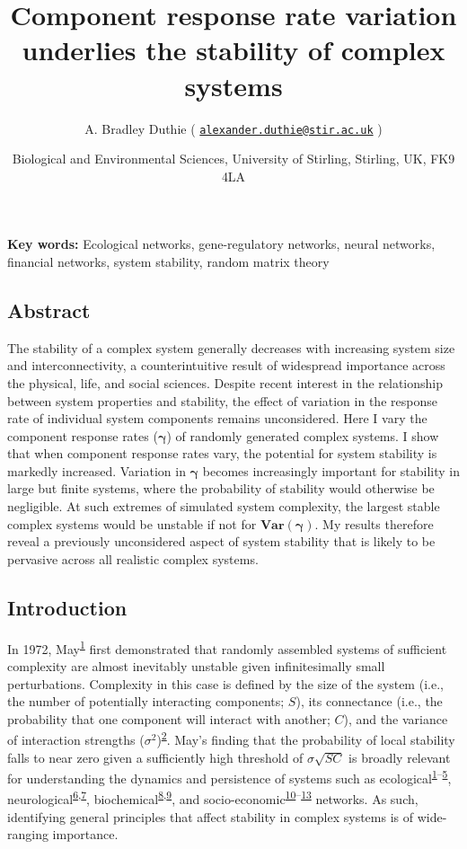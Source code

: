 \documentclass[]{article}
\title{Component response rate variation underlies the stability of complex
systems}
\author{A. Bradley Duthie (
\href{mailto:alexander.duthie@stir.ac.uk}{\nolinkurl{alexander.duthie@stir.ac.uk}}
)}
\date{Biological and Environmental Sciences, University of Stirling, Stirling,
UK, FK9 4LA}
\begin{document}
\maketitle

\textbf{Key words:} Ecological networks, gene-regulatory networks,
neural networks, financial networks, system stability, random matrix
theory

\subsection{Abstract}\label{abstract}

The stability of a complex system generally decreases with increasing
system size and interconnectivity, a counterintuitive result of
widespread importance across the physical, life, and social sciences.
Despite recent interest in the relationship between system properties
and stability, the effect of variation in the response rate of
individual system components remains unconsidered. Here I vary the
component response rates (\(\boldsymbol{\gamma}\)) of randomly generated
complex systems. I show that when component response rates vary, the
potential for system stability is markedly increased. Variation in
\(\boldsymbol{\gamma}\) becomes increasingly important for stability in
large but finite systems, where the probability of stability would
otherwise be negligible. At such extremes of simulated system
complexity, the largest stable complex systems would be unstable if not
for \(\boldsymbol{Var(\gamma)}\). My results therefore reveal a
previously unconsidered aspect of system stability that is likely to be
pervasive across all realistic complex systems.

\subsection{Introduction}\label{introduction}

In 1972, May\textsuperscript{\protect\hyperlink{ref-May1972}{1}} first
demonstrated that randomly assembled systems of sufficient complexity
are almost inevitably unstable given infinitesimally small
perturbations. Complexity in this case is defined by the size of the
system (i.e., the number of potentially interacting components; \(S\)),
its connectance (i.e., the probability that one component will interact
with another; \(C\)), and the variance of interaction strengths
(\(\sigma^{2}\))\textsuperscript{\protect\hyperlink{ref-Allesina2012}{2}}.
May's finding that the probability of local stability falls to near zero
given a sufficiently high threshold of \(\sigma\sqrt{SC}\) is broadly
relevant for understanding the dynamics and persistence of systems such
as
ecological\textsuperscript{\protect\hyperlink{ref-May1972}{1}--\protect\hyperlink{ref-Grilli2017}{5}},
neurological\textsuperscript{\protect\hyperlink{ref-Gray2008}{6},\protect\hyperlink{ref-Gray2009}{7}},
biochemical\textsuperscript{\protect\hyperlink{ref-Rosenfeld2009}{8},\protect\hyperlink{ref-MacArthur2010}{9}},
and
socio-economic\textsuperscript{\protect\hyperlink{ref-May2008}{10}--\protect\hyperlink{ref-Bardoscia2017}{13}}
networks. As such, identifying general principles that affect stability
in complex systems is of wide-ranging importance.
\end{document}
